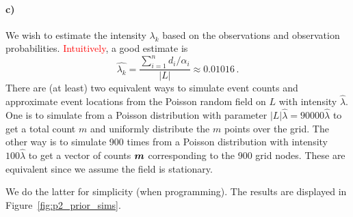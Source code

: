 \paragraph{c)}
We wish to estimate the intensity $\lambda_k$ based on the observations and observation probabilities. \textcolor{red}{Intuitively}, a good estimate is
%
\begin{equation*}
    \hat{\lambda_k} = \frac{\sum_{i=1}^n d_i / \alpha_i}{|L|} \approx 0.01016 \, .
\end{equation*}
%
There are (at least) two equivalent ways to simulate event counts and approximate event locations from the Poisson random field on $L$ with intensity $\hat{\lambda}$. One is to simulate from a Poisson distribution with parameter $|L|\hat{\lambda} = 90000\hat{\lambda}$ to get a total count $m$ and uniformly distribute the $m$ points over the grid. The other way is to simulate 900 times from a Poisson distribution with intensity $100\hat{\lambda}$ to get a vector of counts $\bm{m}$ corresponding to the 900 grid nodes. These are equivalent since we assume the field is stationary.

We do the latter for simplicity (when programming). The results are displayed in Figure~\ref{fig:p2_prior_sims}.

